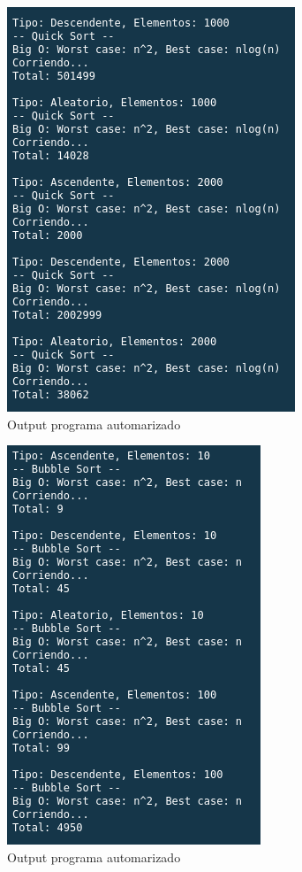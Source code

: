 \documentclass{article}
\begin{document}
		\begin{figure}[H]
			\centering
			\includegraphics[scale = 1]{images/e43.png}
			\caption{Output programa automarizado}
		\end{figure}
	
		\begin{figure}[H]
			\centering
			\includegraphics[scale = 1]{images/e44.png}
			\caption{Output programa automarizado}
		\end{figure}
	
\end{document}
